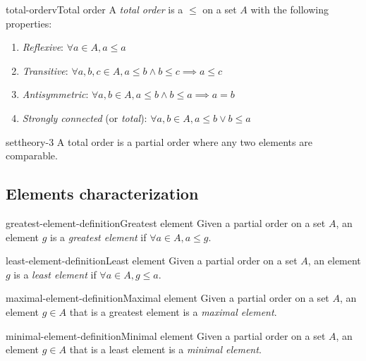 \documentclass[preview]{standalone}
\begin{document}
\begin{snippetdefinition}{total-orderv}{Total order}
    A \textit{total order} is a \homrelation \(\leq\) on a set \(A\)
    with the following properties:
    
    \begin{enumerate}
        \item \textit{Reflexive}: \(\forall a \in A, a \leq a\)
        \item \textit{Transitive}: \(\forall a,b,c \in A, a \leq b \land b \leq c \implies a \leq c\)
        \item \textit{Antisymmetric}: \(\forall a,b \in A, a \leq b \land b \leq a \implies a=b\)
        \item \textit{Strongly connected} (or \textit{total}): \(\forall a,b\in A, a \leq b \lor b\leq a\)
    \end{enumerate}
\end{snippetdefinition}

\begin{snippet}{settheory-3}
    A total order is a partial order where any two elements are comparable.
\end{snippet}

\subsection{Elements characterization}

\begin{snippetdefinition}{greatest-element-definition}{Greatest element}
    Given a partial order on a set \(A\), an element \(g\) is a \textit{greatest element}
    if \(\forall a\in A, a \leq g\).
\end{snippetdefinition}

\begin{snippetdefinition}{least-element-definition}{Least element}
    Given a partial order on a set \(A\), an element \(g\) is a \textit{least element}
    if \(\forall a\in A, g \leq a\).
\end{snippetdefinition}

\begin{snippetdefinition}{maximal-element-definition}{Maximal element}
    Given a partial order on a set \(A\), an element \(g\in A\) that is
    a greatest element is a \textit{maximal element}.
\end{snippetdefinition}

\begin{snippetdefinition}{minimal-element-definition}{Minimal element}
    Given a partial order on a set \(A\), an element \(g\in A\) that is
    a least element is a \textit{minimal element}.
\end{snippetdefinition}
\end{document}

